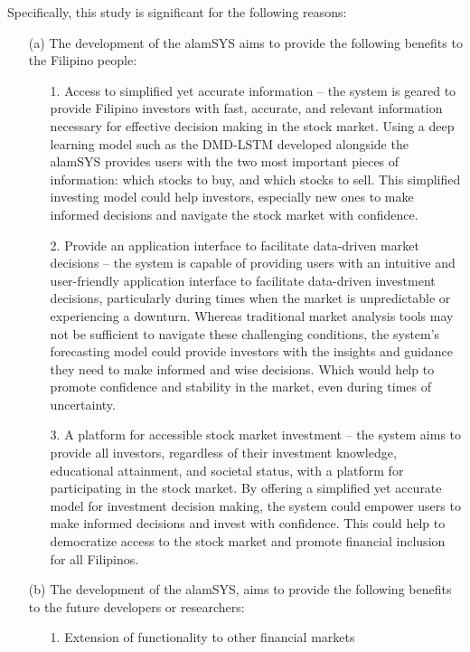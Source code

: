 Specifically, this study is significant for the following reasons:
\begin{itemize}
  \item[(a)] The development of the alamSYS aims to provide the 
  following benefits to the Filipino people:
  \begin{itemize}
    \item[1.]	Access to simplified yet accurate information 
    – the system is geared to provide Filipino investors with fast, 
    accurate, and relevant information necessary for effective decision making 
    in the stock market. Using a deep learning model such as the DMD-LSTM 
    developed alongside the alamSYS provides users with the two most 
    important pieces of information: 
    which stocks to buy, and which stocks to sell. This simplified investing 
    model could help investors, especially new ones to make informed decisions 
    and navigate the stock market with confidence.
    \item[2.]	Provide an application interface to facilitate data-driven market 
    decisions – the system is capable of providing users with an intuitive and user-friendly 
    application interface to facilitate data-driven investment decisions, 
    particularly during times when the market is unpredictable 
    or experiencing a downturn. Whereas traditional market analysis tools may not 
    be sufficient to navigate these challenging conditions, the system's forecasting
    model could provide investors with the insights and guidance 
    they need to make informed and wise decisions. Which would help to promote 
    confidence and stability in the market, even during times of uncertainty.
    \item[3.]	A platform for accessible stock market investment – 
    the system aims to provide all investors, regardless of their 
    investment knowledge, educational attainment, and societal status, 
    with a platform for participating in the stock market. By offering a 
    simplified yet accurate model for investment decision making, the 
    system could empower users to make informed decisions and invest with confidence. 
    This could help to democratize access to the stock market and promote financial 
    inclusion for all Filipinos.
  \end{itemize}
  \item[(b)] The development of the alamSYS, aims to provide the following benefits 
  to the future developers or researchers:
  \begin{itemize}
    \item[1.]	Extension of functionality to other financial markets 

\end{itemize}
\end{itemize}
